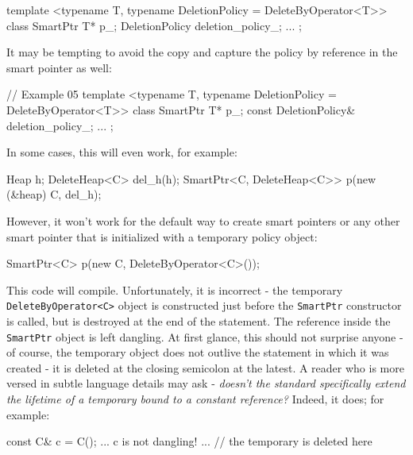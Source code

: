 \begin{code}
template <typename T,
          typename DeletionPolicy = DeleteByOperator<T>>
class SmartPtr {
  T* p_;
  DeletionPolicy deletion_policy_;
  ...
};
\end{code}

It may be tempting to avoid the copy and capture the policy by reference in the smart pointer as well:

\begin{code}
// Example 05
template <typename T,
          typename DeletionPolicy = DeleteByOperator<T>>
class SmartPtr {
  T* p_;
  const DeletionPolicy& deletion_policy_;
  ...
};
\end{code}

In some cases, this will even work, for example:

\begin{code}
Heap h;
DeleteHeap<C> del_h(h);
SmartPtr<C, DeleteHeap<C>> p(new (&heap) C, del_h);
\end{code}

However, it won't work for the default way to create smart pointers or any other smart pointer that is initialized with a temporary policy object:

\begin{code}
SmartPtr<C> p(new C, DeleteByOperator<C>());
\end{code}

This code will compile. Unfortunately, it is incorrect - the temporary \texttt{DeleteByOperator\textless{}C\textgreater{}} object is constructed just before the \texttt{SmartPtr} constructor is called, but is destroyed at the end of the statement. The reference inside the \texttt{SmartPtr} object is left dangling. At first glance, this should not surprise anyone - of course, the temporary object does not outlive the statement in which it was created - it is deleted at the closing semicolon at the latest. A reader who is more versed in subtle language details may ask - \emph{doesn't the standard specifically extend the lifetime of a temporary bound to a constant reference?} Indeed, it does; for example:

\begin{code}
{
  const C& c = C();
  ... c is not dangling! ...
} // the temporary is deleted here
\end{code}

